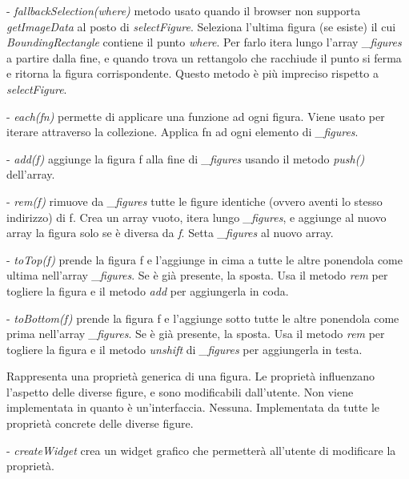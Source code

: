 \begin{elencopuntato}[\subsubsecindent]
\item[-] \textit{fallbackSelection(where)} metodo usato quando il browser non supporta \textit{getImageData} al posto di \textit{selectFigure}. Seleziona l'ultima figura (se esiste) il cui \textit{BoundingRectangle} contiene il punto \textit{where}. Per farlo itera lungo l'array \textit{{\_}figures} a partire dalla fine, e quando trova un rettangolo che racchiude il punto si ferma e ritorna la figura corrispondente. Questo metodo \`e pi\`u impreciso rispetto a \textit{selectFigure}.
\item[-]  \textit{each(fn)} permette di applicare una funzione ad ogni figura. Viene usato per iterare attraverso la collezione. Applica fn ad ogni elemento di \textit{{\_}figures}. 
\item[-]  \textit{add(f)} aggiunge la figura f alla fine di \textit{{\_}figures} usando il metodo \textit{push()} dell'array.
\item[-]  \textit{rem(f)} rimuove da \textit{{\_}figures} tutte le figure identiche (ovvero aventi lo stesso indirizzo) di f. Crea un array vuoto, itera lungo \textit{{\_}figures}, e aggiunge al nuovo array la figura solo se \`e diversa da \textit{f}. Setta \textit{{\_}figures} al nuovo array.
\item[-] \textit{toTop(f)} prende la figura f e l'aggiunge in cima a tutte le altre ponendola come ultima nell'array \textit{{\_}figures}. Se \`e gi\`a presente, la sposta. Usa il metodo \textit{rem} per togliere la figura e il metodo \textit{add} per aggiungerla in coda.
\item[-] \textit{toBottom(f)} prende la figura f e l'aggiunge sotto tutte le altre ponendola come prima nell'array \textit{{\_}figures}. Se \`e gi\`a presente, la sposta. Usa il metodo \textit{rem} per togliere la figura e il metodo \textit{unshift} di \textit{{\_}figures} per aggiungerla in testa.
\end{elencopuntato}


Rappresenta una propriet\`a generica di una figura. Le propriet\`a influenzano 
l'aspetto delle diverse figure, e sono modificabili dall'utente. Non viene implementata in quanto \`e un'interfaccia.
Nessuna.
Implementata da tutte le propriet\`a concrete delle diverse figure.
\begin{elencopuntato}[\subsubsecindent]
\item[-] \textit{createWidget} crea un widget grafico che permetter\`a all'utente di modificare la propriet\`a.
\end{elencopuntato}

